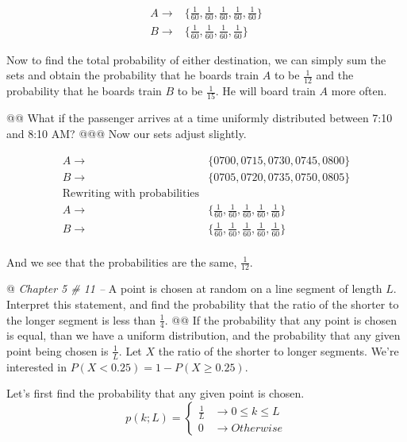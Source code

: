 \documentclass[10pt]{article}
\begin{document}
\begin{easylist}[enumerate]
    \[
        \begin{aligned}
            A \to &\{ \frac{1}{60},\frac{1}{60},\frac{1}{60},\frac{1}{60},\frac{1}{60} \}\\
            B \to &\{ \frac{1}{60},\frac{1}{60},\frac{1}{60},\frac{1}{60} \}
        \end{aligned}
    \]

    Now to find the total probability of either destination, we can simply sum the sets and obtain the probability that
    he boards train $A$ to be $\frac{1}{12}$ and the probability that he boards train $B$ to be $\frac{1}{15}$. He will
    board train $A$ more often.

    @@ What if the passenger arrives at a time uniformly distributed between 7:10 and 8:10 AM?
    @@@ Now our sets adjust slightly.

    \[
        \begin{aligned}
            A \to &\{ 0700, 0715, 0730, 0745, 0800 \}\\
            B \to &\{ 0705, 0720, 0735, 0750, 0805 \}\\
            \text{Rewriting with probabilities}\\
            A \to &\{ \frac{1}{60},\frac{1}{60},\frac{1}{60},\frac{1}{60},\frac{1}{60} \}\\
            B \to &\{ \frac{1}{60},\frac{1}{60},\frac{1}{60},\frac{1}{60},\frac{1}{60} \}\\
        \end{aligned}
    \]

    And we see that the probabilities are the same, $\frac{1}{12}$.

    @ \textit{Chapter 5 \# 11 --} A point is chosen at random on a line segment of length $L$. Interpret this statement,
    and find the probability that the ratio of the shorter to the longer segment is less than $\frac{1}{4}$.
    @@ If the probability that any point is chosen is equal, than we have a uniform distribution, and the probability
    that any given point being chosen is $\frac{1}{L}$. Let $X$ the ratio of the shorter to longer segments. We're
    interested in $P(X < 0.25) = 1 - P(X \ge 0.25)$.\newline

    Let's first find the probability that any given point is chosen.
    \[
        p(k; L) =
        \begin{cases}
            \frac{1}{L} &\to 0 \le k \le L\\
            0 &\to Otherwise
        \end{cases}
    \]


\end{easylist}
\end{document}
